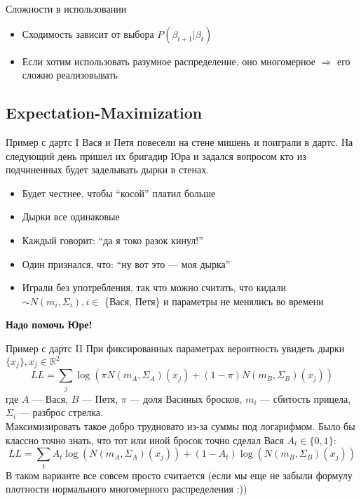 \documentclass[14pt, fleqn, xcolor={dvipsnames, table}]{beamer}
\begin{document}
\begin{frame}{Сложности в использовании}
\begin{itemize}
  \item Сходимость зависит от выбора $P(\beta_{t+1}|\beta_{t})$
  \item Если хотим использовать разумное распределение, оно многомерное $\Rightarrow$ его сложно реализовывать
\end{itemize}
\end{frame}

\subsection{Expectation-Maximization}
\begin{frame}{Пример с дартс I}
\small
Вася и Петя повесели на стене мишень и поиграли в дартс. На следующий день пришел их бригадир Юра и задался вопросом кто из подчиненных будет заделывать дырки в стенах.
\begin{itemize}
  \item Будет честнее, чтобы ``косой'' платил больше
  \item Дырки все одинаковые
  \item Каждый говорит: ``да я токо разок кинул!''
  \item Один признался, что: ``ну вот это --- моя дырка''
  \item Играли без употребления, так что можно считать, что кидали $\sim N(m_i, \Sigma_i), i \in$ \{Вася, Петя\} и параметры не менялись во времени
\end{itemize}
\textbf{Надо помочь Юре!}
\end{frame}

\begin{frame}{Пример с дартс II}
\small
При фиксированных параметрах вероятность увидеть дырки $\{x_j\}, x_j \in \mathbb{R}^2$
$$
LL = \sum_j \log(\pi N(m_A, \Sigma_A)(x_j) + (1 - \pi) N(m_B, \Sigma_B)(x_j))
$$
где $A$ --- Вася, $B$ --- Петя, $\pi$ --- доля Васиных бросков, $m_i$ --- сбитость прицела, $\Sigma_i$ --- разброс стрелка. \\
Максимизировать такое добро трудновато из-за суммы под логарифмом. Было бы классно точно знать, что тот или иной бросок точно сделал Вася $A_t \in \{0,1\}$:
$$
LL = \sum_t A_t \log(N(m_A, \Sigma_A)(x_j)) +  (1 - A_t) \log(N(m_B, \Sigma_B)(x_j))
$$
В таком варианте все совсем просто считается (если мы еще не забыли формулу плотности нормального многомерного распределения :))
\end{frame}
\end{document}
